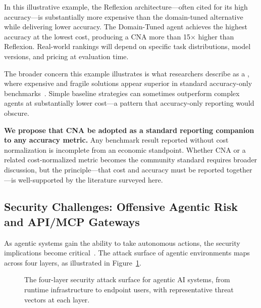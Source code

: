 In this illustrative example, the Reflexion architecture---often cited for its high accuracy---is substantially more expensive than the domain-tuned alternative while delivering lower accuracy. The Domain-Tuned agent achieves the highest accuracy at the lowest cost, producing a CNA more than 15$\times$ higher than Reflexion. Real-world rankings will depend on specific task distributions, model versions, and pricing at evaluation time.

The broader concern this example illustrates is what researchers describe as a , where expensive and fragile solutions appear superior in standard accuracy-only benchmarks~\citep{measurement_imbalance}. Simple baseline strategies can sometimes outperform complex agents at substantially lower cost---a pattern that accuracy-only reporting would obscure.

\textbf{We propose that CNA be adopted as a standard reporting companion to any accuracy metric.} Any benchmark result reported without cost normalization is incomplete from an economic standpoint. Whether CNA or a related cost-normalized metric becomes the community standard requires broader discussion, but the principle---that cost and accuracy must be reported together---is well-supported by the literature surveyed here.

\subsection{Security Challenges: Offensive Agentic Risk and API/MCP Gateways}

As agentic systems gain the ability to take autonomous actions, the security implications become critical~\citep{securing_ai_agents}. The attack surface of agentic environments maps across four layers, as illustrated in Figure~\ref{fig:security_layers}.

\begin{figure}[htbp]
\centering

\caption{The four-layer security attack surface for agentic AI systems, from runtime infrastructure to endpoint users, with representative threat vectors at each layer.}
\label{fig:security_layers}
\end{figure}

